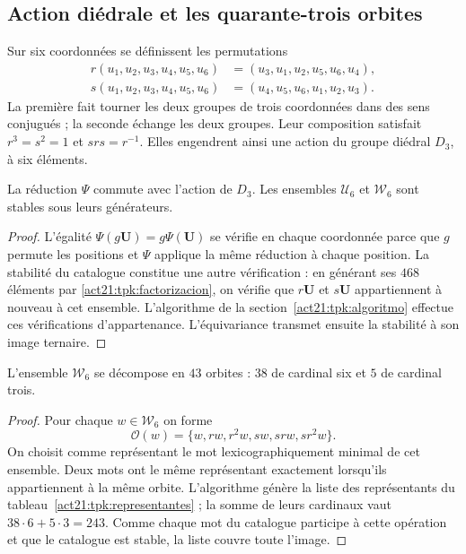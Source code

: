 \subsection{Action diédrale et les quarante-trois orbites}
\label{act21:tpk:orbitas}

Sur six coordonnées se définissent les permutations
\begin{align}
 r(u_1,u_2,u_3,u_4,u_5,u_6)
   &=(u_3,u_1,u_2,u_5,u_6,u_4),\\
 s(u_1,u_2,u_3,u_4,u_5,u_6)
   &=(u_4,u_5,u_6,u_1,u_2,u_3).
 \label{act21:tpk:generadores-diedrales}
\end{align}
La première fait tourner les deux groupes de trois coordonnées dans des sens conjugués ;
la seconde échange les deux groupes. Leur composition satisfait
\(r^3=s^2=1\) et \(srs=r^{-1}\). Elles engendrent ainsi une action du groupe diédral
\(D_3\), à six éléments.

\begin{proposition}
\label{act21:tpk:equivarianza}
La réduction \(\Psi\) commute avec l'action de \(D_3\). Les ensembles
\(\mathcal U_6\) et \(\mathcal W_6\) sont stables sous leurs générateurs.
\end{proposition}
\begin{proof}
L'égalité \(\Psi(g\mathbf U)=g\Psi(\mathbf U)\) se vérifie en chaque
coordonnée parce que \(g\) permute les positions et \(\Psi\) applique la même
réduction à chaque position. La stabilité du catalogue constitue une autre
vérification : en générant ses \(468\) éléments par
\eqref{act21:tpk:factorizacion}, on vérifie que \(r\mathbf U\) et
\(s\mathbf U\) appartiennent à nouveau à cet ensemble. L'algorithme de la
section~\ref{act21:tpk:algoritmo} effectue ces vérifications d'appartenance.
L'équivariance transmet ensuite la stabilité à son image ternaire.
\end{proof}

\begin{proposition}
\label{act21:tpk:43}
L'ensemble \(\mathcal W_6\) se décompose en \(43\) orbites : \(38\)
de cardinal six et \(5\) de cardinal trois.
\end{proposition}
\begin{proof}
Pour chaque \(w\in\mathcal W_6\) on forme
\[
 \mathcal O(w)=\{w,rw,r^2w,sw,srw,sr^2w\}.
\]
On choisit comme représentant le mot lexicographiquement minimal de cet ensemble. Deux mots ont le même représentant exactement lorsqu'ils appartiennent à la même orbite. L'algorithme génère la liste des représentants du tableau~\ref{act21:tpk:representantes} ; la somme de leurs cardinaux vaut \(38\cdot6+5\cdot3=243\). Comme chaque mot du catalogue participe à cette opération et que le catalogue est stable, la liste couvre toute l'image.
\end{proof}

